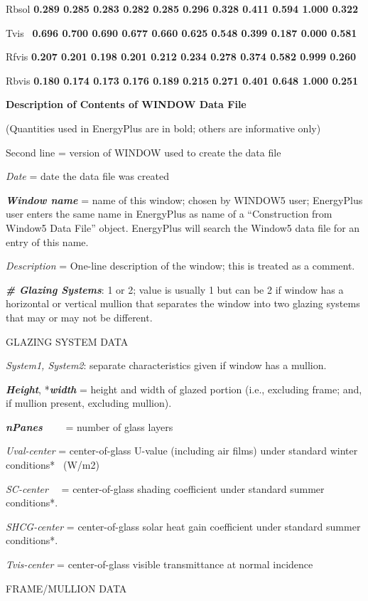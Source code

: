 Rbsol \textbf{0.289 0.285 0.283 0.282 0.285 0.296 0.328 0.411 0.594 1.000 0.322}

Tvis~ \textbf{0.696 0.700 0.690 0.677 0.660 0.625 0.548 0.399 0.187 0.000 0.581}

Rfvis \textbf{0.207 0.201 0.198 0.201 0.212 0.234 0.278 0.374 0.582 0.999 0.260}

Rbvis \textbf{0.180 0.174 0.173 0.176 0.189 0.215 0.271 0.401 0.648 1.000 0.251}

\textbf{Description of Contents of WINDOW Data File}

(Quantities used in EnergyPlus are in bold; others are informative only)

Second line = version of WINDOW used to create the data file

\emph{Date} = date the data file was created

\textbf{\emph{Window name}} = name of this window; chosen by WINDOW5 user; EnergyPlus user enters the same name in EnergyPlus as name of a ``Construction from Window5 Data File'' object. EnergyPlus will search the Window5 data file for an entry of this name.

\emph{Description} = One-line description of the window; this is treated as a comment.

\textbf{\emph{\# Glazing Systems}}: 1 or 2; value is usually 1 but can be 2 if window has a horizontal or vertical mullion that separates the window into two glazing systems that may or may not be different.

GLAZING SYSTEM DATA

\emph{System1, System2}: separate characteristics given if window has a mullion.

\textbf{\emph{Height}}, *\textbf{\emph{width}} = height and width of glazed portion (i.e., excluding frame; and, if mullion present, excluding mullion).

\textbf{\emph{nPanes}}~~~~ = number of glass layers

\emph{Uval-center} = center-of-glass U-value (including air films) under standard winter conditions*~ (W/m2)

\emph{SC-center}~~ = center-of-glass shading coefficient under standard summer conditions*.

\emph{SHCG-center} = center-of-glass solar heat gain coefficient under standard summer conditions*.

\emph{Tvis-center} = center-of-glass visible transmittance at normal incidence

FRAME/MULLION DATA

